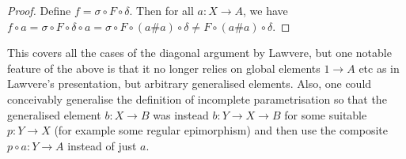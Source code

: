 \documentclass{tufte-handout}
\theoremstyle{definition}
\begin{document}
\begin{proof}
  Define $f = \sigma\circ F\circ \delta$. 
  Then for all $a\colon X\to A$, we have $f\circ a = \sigma \circ F\circ \delta \circ a= \sigma \circ F \circ (a\#a)\circ \delta \not=F\circ (a\#a)\circ \delta$.
\end{proof}

\noindent
This covers all the cases of the diagonal argument by Lawvere, but  one notable feature of the above is that it no longer relies on global elements $1\to A$ etc as in Lawvere's presentation, but arbitrary generalised elements.
Also, one could conceivably generalise the definition of incomplete parametrisation so that the generalised element $b\colon X\to B$ was instead $b\colon Y\to X \to B$ for some suitable $p\colon Y\to X$ (for example some regular epimorphism) and then use the composite $p\circ a\colon Y\to A$ instead of just $a$.
\end{document}
